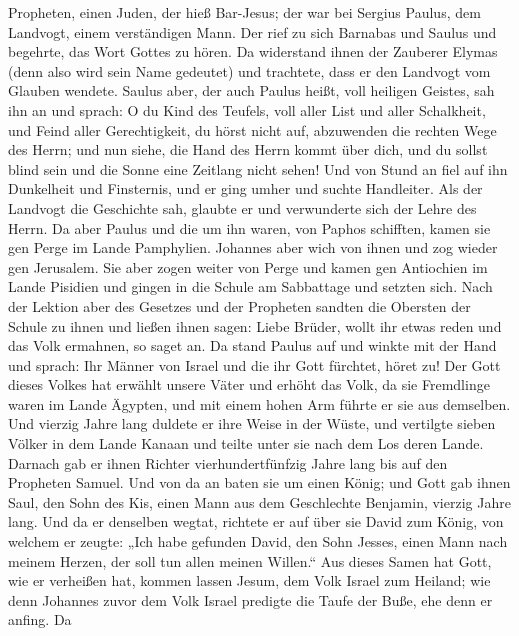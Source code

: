 Propheten, einen Juden, der hieß Bar-Jesus;  der war bei
Sergius Paulus, dem Landvogt, einem verständigen Mann. Der rief zu sich
Barnabas und Saulus und begehrte, das Wort Gottes zu hören. 
Da widerstand ihnen der Zauberer Elymas (denn also wird sein Name
gedeutet) und trachtete, dass er den Landvogt vom Glauben wendete.
 Saulus aber, der auch Paulus heißt, voll heiligen Geistes,
sah ihn an  und sprach: O du Kind des Teufels, voll aller
List und aller Schalkheit, und Feind aller Gerechtigkeit, du hörst nicht
auf, abzuwenden die rechten Wege des Herrn;  und nun siehe,
die Hand des Herrn kommt über dich, und du sollst blind sein und die
Sonne eine Zeitlang nicht sehen! Und von Stund an fiel auf ihn
Dunkelheit und Finsternis, und er ging umher und suchte Handleiter.
 Als der Landvogt die Geschichte sah, glaubte er und
verwunderte sich der Lehre des Herrn.  Da aber Paulus und
die um ihn waren, von Paphos schifften, kamen sie gen Perge im Lande
Pamphylien. Johannes aber wich von ihnen und zog wieder gen Jerusalem.
 Sie aber zogen weiter von Perge und kamen gen Antiochien
im Lande Pisidien und gingen in die Schule am Sabbattage und setzten
sich.  Nach der Lektion aber des Gesetzes und der Propheten
sandten die Obersten der Schule zu ihnen und ließen ihnen sagen: Liebe
Brüder, wollt ihr etwas reden und das Volk ermahnen, so saget an.
 Da stand Paulus auf und winkte mit der Hand und sprach:
Ihr Männer von Israel und die ihr Gott fürchtet, höret zu! 
Der Gott dieses Volkes hat erwählt unsere Väter und erhöht das Volk, da
sie Fremdlinge waren im Lande Ägypten, und mit einem hohen Arm führte er
sie aus demselben.  Und vierzig Jahre lang duldete er ihre
Weise in der Wüste,  und vertilgte sieben Völker in dem
Lande Kanaan und teilte unter sie nach dem Los deren Lande.
 Darnach gab er ihnen Richter vierhundertfünfzig Jahre lang
bis auf den Propheten Samuel.  Und von da an baten sie um
einen König; und Gott gab ihnen Saul, den Sohn des Kis, einen Mann aus
dem Geschlechte Benjamin, vierzig Jahre lang.  Und da er
denselben wegtat, richtete er auf über sie David zum König, von welchem
er zeugte: „Ich habe gefunden David, den Sohn Jesses, einen Mann nach
meinem Herzen, der soll tun allen meinen Willen.``  Aus
dieses Samen hat Gott, wie er verheißen hat, kommen lassen Jesum, dem
Volk Israel zum Heiland;  wie denn Johannes zuvor dem Volk
Israel predigte die Taufe der Buße, ehe denn er anfing.  Da
